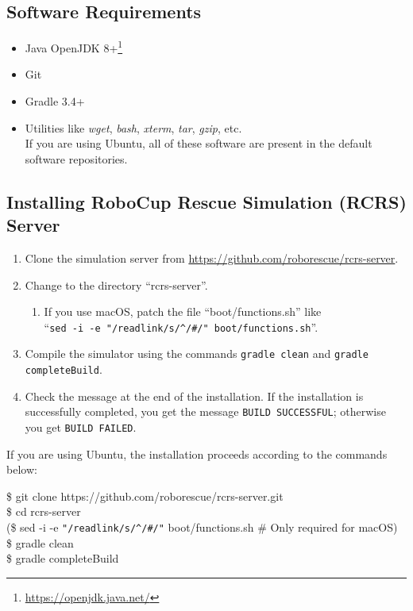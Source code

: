 \documentclass{article}
\begin{document}
\subsection{Software Requirements}
 \begin{itemize}
  \item Java OpenJDK 8+\footnote{\url{https://openjdk.java.net/}}
  \item Git
  \item Gradle 3.4+
  \item Utilities like \emph{wget}, \emph{bash}, \emph{xterm}, \emph{tar}, \emph{gzip}, etc.\\
        If you are using Ubuntu, all of these software are present in the
        default software repositories.
 \end{itemize}
\subsection{Installing RoboCup Rescue Simulation (RCRS) Server}
\begin{enumerate}
 \item Clone the simulation server from
       \url{https://github.com/roborescue/rcrs-server}.
 \item Change to the directory ``rcrs-server''.
       \begin{enumerate}
         \item If you use macOS, patch the file ``boot/functions.sh'' like\\
               ``\verb|sed -i -e "/readlink/s/^/#/" boot/functions.sh|''.
       \end{enumerate}
 \item Compile the simulator using the commands \texttt{gradle clean}
       and \texttt{gradle completeBuild}.
 \item Check the message at the end of the installation.
       If the installation is successfully completed, you get the message \texttt{BUILD SUCCESSFUL}; otherwise you get \texttt{BUILD FAILED}.
\end{enumerate}

If you are using Ubuntu, the installation proceeds according to the commands below:

\begin{center}
  \begin{tcolorbox}[title=Installation on Ubuntu, width=.98\linewidth]
  {\ttfamily\small
  \$ git clone https://github.com/roborescue/rcrs-server.git\\
   \$ cd rcrs-server\\
   (\$ sed -i -e \verb|"/readlink/s/^/#/"| boot/functions.sh \# Only required for macOS)\\
  \$ gradle clean\\
  \$ gradle completeBuild
  }
  \end{tcolorbox}
\end{center}
\end{document}
